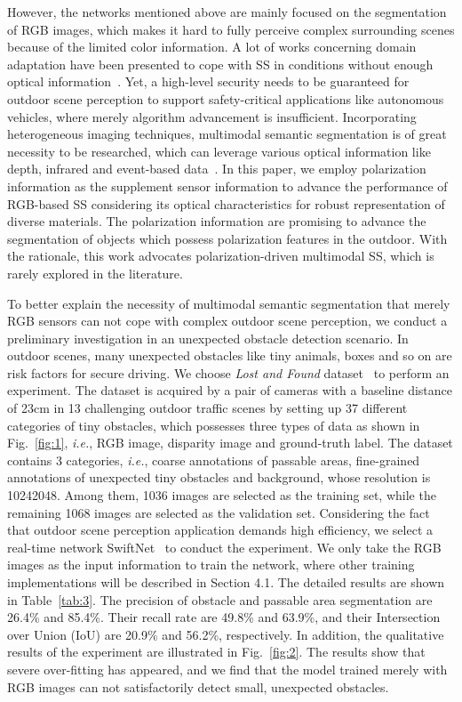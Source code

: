 \documentclass{osa-article}
\begin{document}
However, the networks mentioned above are mainly focused on the segmentation of RGB images, which makes it hard to fully perceive complex surrounding scenes because of the limited color information. 
A lot of works concerning domain adaptation have been presented to cope with SS in conditions without enough optical information~\cite{romera2019bridging,sun2019see}.
Yet, a high-level security needs to be guaranteed for outdoor scene perception to support safety-critical applications like autonomous vehicles, where merely algorithm advancement is insufficient.
Incorporating heterogeneous imaging techniques, multimodal semantic segmentation is of great necessity to be researched, which can leverage various optical information like depth, infrared and event-based data~\cite{zhang2020deep,zhang2020issafe}. 
In this paper, we employ polarization information as the supplement sensor information to advance the performance of RGB-based SS considering its optical characteristics for robust representation of diverse materials.
The polarization information are promising to advance the segmentation of objects which possess polarization features in the outdoor.
With the rationale, this work advocates polarization-driven multimodal SS, which is rarely explored in the literature.

To better explain the necessity of multimodal semantic segmentation that merely RGB sensors can not cope with complex outdoor scene perception,
we conduct a preliminary investigation in an unexpected obstacle detection scenario.
In outdoor scenes, many unexpected obstacles like tiny animals, boxes and so on are risk factors for secure driving.
We choose \textit{Lost and Found} dataset~\cite{pinggera2016lost} to perform an experiment.
The dataset is acquired by a pair of cameras with a baseline distance of 23cm in 13 challenging outdoor traffic scenes by setting up 37 different categories of tiny obstacles, which possesses three types of data as shown in Fig.~\ref{fig:1}, \textit{i.e.}, RGB image, disparity image and ground-truth label.
The dataset contains 3 categories, \textit{i.e.}, coarse annotations of passable areas, fine-grained annotations of unexpected tiny obstacles and background, whose resolution is 10242048.
Among them, 1036 images are selected as the training set, while the remaining 1068 images are selected as the validation set.
Considering the fact that outdoor scene perception application demands high efficiency, we select a real-time network SwiftNet~\cite{orvsic2019defense} to conduct the experiment.
We only take the RGB images as the input information to train the network, where other training implementations will be described in Section 4.1.
The detailed results are shown in Table~\ref{tab:3}.
The precision of obstacle and passable area segmentation are 26.4\% and 85.4\%. Their recall rate are 49.8\% and 63.9\%, and their Intersection over Union (IoU) are 20.9\% and 56.2\%, respectively.
In addition, the qualitative results of the experiment are illustrated in Fig.~\ref{fig:2}.
The results show that severe over-fitting has appeared, and we find that the model trained merely with RGB images can not satisfactorily detect small, unexpected obstacles.
\end{document}
